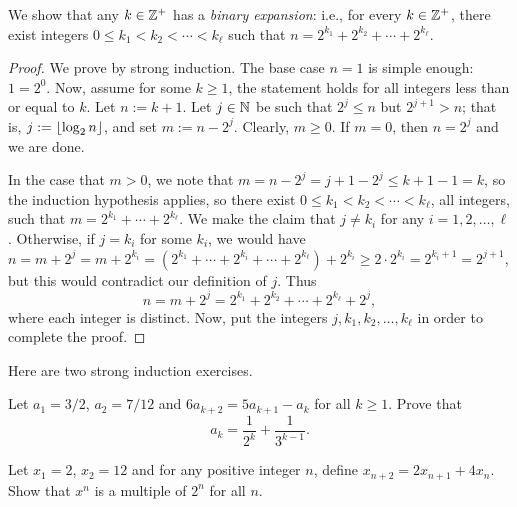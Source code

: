 \documentclass{article}
\begin{document}
\begin{example}
We show that any $k\in\mathbb Z^+$ has a \textit{binary expansion}: i.e., for every $k\in\mathbb Z^+$, there exist integers $0 \leq k_1 < k_2 < \cdots < k_\ell$ such that $n = 2^{k_1} + 2^{k_2} + \cdots + 2^{k_\ell}$.
\end{example}
\begin{proof}
We prove by strong induction. The base case $n=1$ is simple enough: $1 = 2^0$. Now, assume for some $k\geq 1$, the statement holds for all integers less than or equal to $k$. Let $n := k+1$. Let $j\in \mathbb N$ be such that $2^j \leq n$ but $2^{j+1} > n$; that is, $j := \left\lfloor \log_2 n\right\rfloor$, and set $m := n - 2^j$. Clearly, $m\geq 0$. If $m = 0$, then $n = 2^j$ and we are done.

In the case that $m > 0$, we note that $m = n-2^j = j+1 - 2^j \leq k+1 - 1 = k$, so the induction hypothesis applies, so there exist $0 \leq k_1 < k_2 < \cdots < k_\ell$, all integers, such that $m = 2^{k_1} + \cdots + 2^{k_\ell}$. We make the claim that $j\neq k_i$ for any $i = 1, 2, \ldots, \ell$. Otherwise, if $j=k_i$ for some $k_i$, we would have $n = m + 2^j = m+2^{k_i}  = (2^{k_1} + \cdots + 2^{k_i} + \cdots + 2^{k_\ell}) + 2^{k_i} \geq 2\cdot 2^{k_i} = 2^{k_i+1} = 2^{j+1}$, but this would contradict our definition of $j$. Thus
$$n = m+2^j = 2^{k_1} + 2^{k_2} + \cdots + 2^{k_\ell} + 2^{j},$$
where each integer is distinct. Now, put the integers $j, k_1, k_2, \ldots, k_\ell$ in order to complete the proof.
\end{proof}
Here are two strong induction exercises.
\begin{exercise}
Let $a_1 = 3/2$, $a_2 = 7/12$ and $6a_{k+2} =5 a_{k+1}-a_k$ for all $k\geq 1$. Prove that
$$a_k = \frac 1{2^k} + \frac 1{3^{k-1}}.$$
\end{exercise}
\begin{exercise}
Let $x_1=2$, $x_2=12$ and for any positive integer $n$, define $x_{n+2} = 2x_{n+1}+4x_n$. Show that $x^n$ is a multiple of $2^n$ for all $n$.
\end{exercise}
\end{document}
